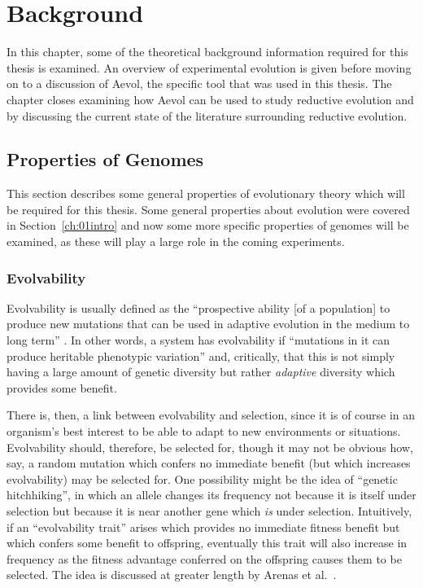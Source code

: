 \chapter{Background}\label{ch:02background}

In this chapter, some of the theoretical background information required for this thesis is examined. An overview of experimental evolution is given before moving on to a discussion of Aevol, the specific tool that was used in this thesis. The chapter closes examining how Aevol can be used to study reductive evolution and by discussing the current state of the literature surrounding reductive evolution.  

\section{Properties of Genomes}
This section describes some general properties of evolutionary theory which will be required for this thesis. Some general properties about evolution were covered in Section~\ref{ch:01intro} and now some more specific properties of genomes will be examined, as these will play a large role in the coming experiments. 

\subsection{Evolvability}\label{subsec:evolvability}
Evolvability is usually defined as the ``prospective ability [of a population] to produce new mutations that can be used in adaptive evolution in the medium to long term'' \cite{brookfield2009evolution}. In other words, a system has evolvability if ``mutations in it can produce heritable phenotypic variation''\cite{doi:10.1098/rspb.2007.1137} and, critically, that this is not simply having a large amount of genetic diversity but rather \textit{adaptive} diversity which provides some benefit. 

There is, then, a link between evolvability and selection, since it is of course in an organism's best interest to be able to adapt to new environments or situations. Evolvability should, therefore, be selected for, though it may not be obvious how, say, a random mutation which confers no immediate benefit (but which increases evolvability) may be selected for. One possibility might be the idea of ``genetic hitchhiking'', in which an allele changes its frequency not because it is itself under selection but because it is near another gene which \textit{is} under selection. Intuitively, if an ``evolvability trait'' arises which provides no immediate fitness benefit but which confers some benefit to offspring, eventually this trait will also increase in frequency as the fitness advantage conferred on the offspring causes them to be selected. The idea is discussed at greater length by Arenas et al.~\cite{selectionEvolvability}. 


